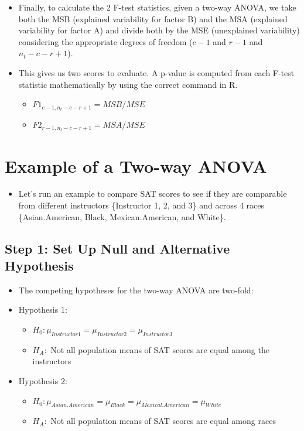 \documentclass[
  letterpaper,
  DIV=11,
  numbers=noendperiod]{scrreprt}
\providecommand{\tightlist}{%
  \setlength{\itemsep}{0pt}\setlength{\parskip}{0pt}}\usepackage{longtable,booktabs,array}
\begin{document}
\begin{itemize}
\tightlist
\item
  Finally, to calculate the 2 F-test statistics, given a two-way ANOVA,
  we take both the MSB (explained variability for factor B) and the MSA
  (explained variability for factor A) and divide both by the MSE
  (unexplained variability) considering the appropriate degrees of
  freedom (\(c-1\) and \(r-1\) and \(n_t-c-r+1\)).
\item
  This gives us two scores to evaluate. A p-value is computed from each
  F-test statistic mathematically by using the correct command in R.

  \begin{itemize}
  \tightlist
  \item
    \(F1_{c-1,n_t-c-r+1 }= MSB/MSE\)
  \item
    \(F2_{r-1,n_t-c-r+1 }= MSA/MSE\)
  \end{itemize}
\end{itemize}

\section{Example of a Two-way ANOVA}\label{example-of-a-two-way-anova}

\begin{itemize}
\tightlist
\item
  Let's run an example to compare SAT scores to see if they are
  comparable from different instructors \{Instructor 1, 2, and 3\} and
  across 4 races \{Asian.American, Black, Mexican.American, and White\}.
\end{itemize}

\subsection{Step 1: Set Up Null and Alternative
Hypothesis}\label{step-1-set-up-null-and-alternative-hypothesis-1}

\begin{itemize}
\item
  The competing hypotheses for the two-way ANOVA are two-fold:
\item
  Hypothesis 1:

  \begin{itemize}
  \tightlist
  \item
    \(H_0: \mu_{Instructor1} = \mu_{Instructor2}= \mu_{Instructor3}\)
  \item
    \(H_A:\) Not all population means of SAT scores are equal among the
    instructors
  \end{itemize}
\item
  Hypothesis 2:

  \begin{itemize}
  \tightlist
  \item
    \(H_0: \mu_{Asian.American} = \mu_{Black} = \mu_{Mexical.American} =  \mu_{White}\)
  \item
    \(H_A:\) Not all population means of SAT scores are equal among
    races
  \end{itemize}
\end{itemize}
\end{document}
